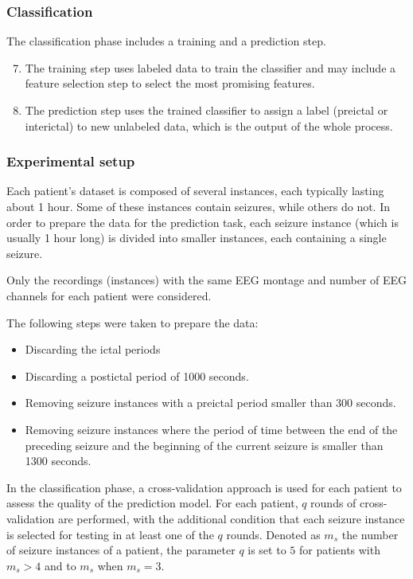 \subsubsection{Classification}
The classification phase includes a training and a prediction step. 
\begin{enumerate}
    \setcounter{enumi}{6}
    \item The training step uses labeled data to train the classifier and may include a feature selection step to select the most promising features.
    \item The prediction step uses the trained classifier to assign a label (preictal or interictal) to new unlabeled data, which is the output of the whole process.
\end{enumerate}

\subsubsection{Experimental setup} \label{subsub:refwork-siena-exp}
Each patient's dataset is composed of several instances, each typically lasting about 1 hour. Some of these instances contain seizures, while others do not. In order to prepare the data for the prediction task, each seizure instance (which is usually 1 hour long) is divided into smaller instances, each containing a single seizure. 

Only the recordings (instances) with the same \gls{EEG} montage and number of EEG channels for each patient were considered.

The following steps were taken to prepare the data:
\begin{itemize}
    \item Discarding the ictal periods
    \item Discarding a postictal period of 1000 seconds.
    \item Removing seizure instances with a preictal period smaller than 300 seconds.
    \item Removing seizure instances where the period of time between the end of the preceding seizure and the beginning of the current seizure is smaller than 1300 seconds.
\end{itemize}

In the classification phase, a cross-validation approach is used for each patient to assess the quality of the prediction model.
For each patient, $q$ rounds of cross-validation are performed, with the additional condition that each seizure instance is selected for testing in at least one of the $q$ rounds. Denoted as $m_s$ the number of seizure instances of a patient, the parameter $q$ is set to $5$ for patients with $m_s > 4$ and to $m_s$ when $m_s = 3$.

